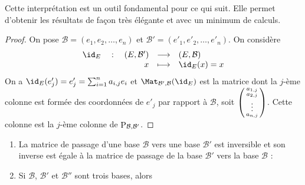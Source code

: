 \documentclass[class=report,crop=false]{standalone}
\begin{document}
\bigskip

Cette interprétation est un outil fondamental pour ce qui suit.
Elle permet d'obtenir les résultats de façon très élégante et avec un
minimum de calculs.

\begin{proof}
On pose $\mathcal{B}=(e_1,e_2, \ldots ,e_n)$ et
$\mathcal{B}'=(e'_1,e'_2, \ldots ,e'_n)$.
On considère
$$\begin{array}{rcl}
\id_E \quad : \quad (E, \mathcal{B}') & \longrightarrow & (E,\mathcal{B})\\
x& \longmapsto & \id_E(x)=x
\end{array}$$
On a $\id_E(e'_j)=e'_j= \sum_{i=1}^n a_{i,j} e_i$ et
$\Mat_{\mathcal{B}',\mathcal{B}} (\id_E)$ est la matrice
dont la $j$-ème colonne est formée des coordonnées de $e'_j$
par rapport à $\mathcal{B}$, soit
$\left(\begin{smallmatrix}
a_{1,j}\cr
a_{2,j}\cr
\vdots \cr
a_{n,j}
\end{smallmatrix}\right)$.
Cette colonne est la $j$-ème colonne de $\mathop{\mathrm{P}}\nolimits_{\mathcal{B},\mathcal{B'}}$.
\end{proof}


\begin{proposition}
\label{prop:chgtbase}
\sauteligne
\begin{enumerate}
  \item La matrice de passage d'une base $\mathcal{B}$ vers une base $\mathcal{B}'$
  est inversible et son inverse est égale à la matrice de passage de la base $\mathcal{B}'$
  vers la base $\mathcal{B}$ :


  \item Si $\mathcal{B}$, $\mathcal{B}'$ et $\mathcal{B}''$ sont trois bases, alors
\end{enumerate}
\end{proposition}
\end{document}
